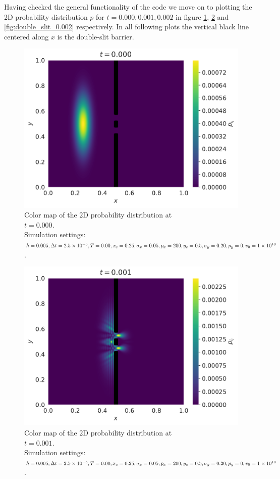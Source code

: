 \documentclass[english,notitlepage,reprint,nofootinbib]{revtex4-1}  %
\begin{document}
Having checked the general functionality of the code we move on to plotting the 2D probability distribution $p$ for $t=0.000, 0.001, 0.002$ in figure \ref{fig:double_slit_0.000}, \ref{fig:double_slit_0.001} and \ref{fig:double_slit_0.002} respectively. In all following plots the vertical black line centered along $x$ is the double-slit barrier.

\begin{figure}[H]
    \centering
    \includegraphics[width=.5\textwidth]{../figures/double_slit_0.000.pdf}
    \caption{Color map of the 2D probability distribution at \\$t = 0.000$. \\Simulation settings: $h = 0.005, \Delta t = 2.5 \times 10^{-5}, \\T = 0.00, x_c = 0.25, \sigma_x = 0.05, p_x = 200, y_c = 0.5, \\\sigma_y = 0.20, p_y = 0, v_0 = 1 \times 10^{10}$.}
    \label{fig:double_slit_0.000}
\end{figure}
\begin{figure}[H]
    \centering
    \includegraphics[width=.5\textwidth]{../figures/double_slit_0.001.pdf}
    \caption{Color map of the 2D probability distribution at \\$t = 0.001$. \\Simulation settings: $h = 0.005, \Delta t = 2.5 \times 10^{-5}, \\T = 0.00, x_c = 0.25, \sigma_x = 0.05, p_x = 200, y_c = 0.5, \\\sigma_y = 0.20, p_y = 0, v_0 = 1 \times 10^{10}$.}
    \label{fig:double_slit_0.001}
\end{figure}
\end{document}
